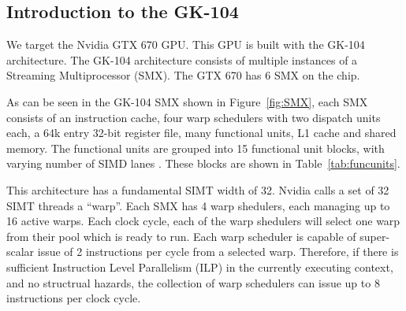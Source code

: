 \documentclass[11pt, oneside, a4paper]{article}
\begin{document}

\subsection{Introduction to the GK-104} %
\label{sub:introduction_to_the_gk_104}

We target the Nvidia GTX 670 GPU. This GPU is built with the GK-104 architecture.
The GK-104 architecture consists of multiple instances of a Streaming Multiprocessor (SMX).
The GTX 670 has 6 SMX on the chip. 

As can be seen in the GK-104 SMX shown in Figure~\ref{fig:SMX}, each SMX consists of an instruction cache, four warp schedulers with two dispatch units each, a 64k entry 32-bit register file, many functional units, L1 cache and shared memory.
The functional units are grouped into 15 functional unit blocks, with varying number of SIMD lanes \cite{Anand}. These blocks are shown in Table~\ref{tab:funcunits}.

This architecture has a fundamental SIMT width of 32. Nvidia calls a set of 32 SIMT threads a ``warp''.
Each SMX has 4 warp shedulers, each managing up to 16 active warps. Each clock cycle, each of the warp shedulers will select one warp from their pool which is ready to run.
Each warp scheduler is capable of super-scalar issue of 2 instructions per cycle from a selected warp.
Therefore, if there is sufficient Instruction Level Parallelism (ILP) in the currently executing context, and no structrual hazards, the collection of warp schedulers can issue up to 8 instructions per clock cycle.
\end{document}
